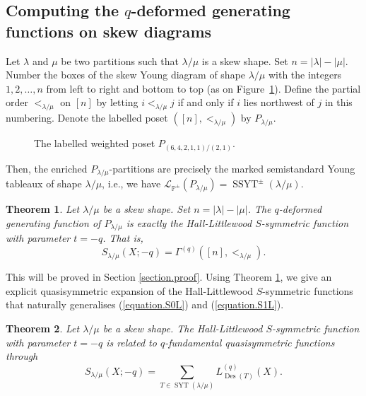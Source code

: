 \documentclass[revision]{FPSAC2024}
\newtheorem{theorem}{Theorem}
\newcommand{\la}{\lambda}
\newcommand{\PP}{\mathbb{P}} %
\newcommand{\SYT}{\operatorname{SYT}}
\newcommand{\SSYT}{\operatorname{SSYT}}
\newcommand{\Des}{\operatorname{Des}}
\begin{document}
\subsection{Computing the $q$-deformed generating functions on skew diagrams}
Let $\lambda$ and $\mu$ be two partitions such that $\lambda/\mu$ is a skew shape.
Set $n = |\la| - |\mu|$.
Number the boxes of the skew Young diagram of shape $\lambda/\mu$ with the integers $1, 2, \ldots, n$ from left to right and bottom to top (as on Figure~\ref{fig.young_poset}). Define the partial order $<_{\la/\mu}$ on $[n]$ by letting $i <_{\la/\mu} j$ if and only if $i$ lies northwest of $j$ in this numbering.
Denote the labelled poset $([n], <_{\la/\mu})$ by $P_{\lambda/\mu}$.
%
\begin{figure}[htbp]
\begin{center}
\end{center}
\caption{The labelled weighted poset $P_{(6,4,2,1,1)/(2,1)}$.}
\label{fig.young_poset}
\end{figure}
%
Then, the enriched $P_{\lambda/\mu}$-partitions are precisely the marked semistandard Young tableaux of shape $\lambda/\mu$, i.e., we have $\mathcal{L}_{\PP^{\pm}}(P_{\lambda/\mu}) = \SSYT^\pm(\la/\mu)$.
%
\begin{theorem}
\label{thm.SG}
Let $\lambda/\mu$ be a skew shape. Set $n = |\la| - |\mu|$. The $q$-deformed generating function of $P_{\lambda/\mu}$ is exactly the Hall-Littlewood $S$-symmetric function with parameter $t=-q$.
That is,
\begin{equation}
S_{\la/\mu}(X;-q) = \Gamma^{(q)}([n],<_{\la/\mu}).
\end{equation}
\end{theorem}
%
\noindent This will be proved in Section \ref{section.proof}. Using Theorem \ref{thm.SG}, we give an explicit quasisymmetric expansion of the Hall-Littlewood $S$-symmetric functions that naturally generalises (\ref{equation.S0L}) and (\ref{equation.S1L}).
%
\begin{theorem}
\label{thm.SL}
Let $\lambda/\mu$ be a skew shape. The Hall-Littlewood $S$-symmetric function with parameter $t=-q$ is related to $q$-fundamental quasisymmetric functions through
\begin{equation}
S_{\la/\mu}(X;-q) = \sum_{T \in \SYT(\la/\mu)}L^{(q)}_{\Des(T)}(X).
\end{equation}
\end{theorem}
\end{document}
